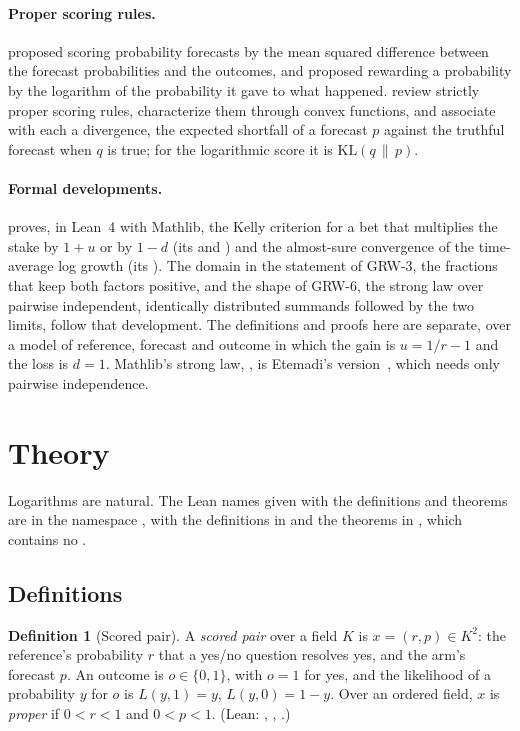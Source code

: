 \documentclass[11pt]{article}
\theoremstyle{plain}
\theoremstyle{definition}
\newtheorem{definition}[theorem]{Definition}
\theoremstyle{remark}
\newcommand{\KL}[2]{\mathrm{KL}(#1\,\|\,#2)}
\begin{document}
\paragraph{Proper scoring rules.} \citet{brier1950} proposed scoring probability forecasts by the
mean squared difference between the forecast probabilities and the outcomes, and \citet{good1952}
proposed rewarding a probability by the logarithm of the probability it gave to what happened.
\citet{gneiting2007} review strictly proper scoring rules, characterize them through convex
functions, and associate with each a divergence, the expected shortfall of a forecast $p$ against
the truthful forecast when $q$ is true; for the logarithmic score it is $\KL{q}{p}$.

\paragraph{Formal developments.} \citet{carrone2026} proves, in Lean~4 with Mathlib, the Kelly
criterion for a bet that multiplies the stake by $1+u$ or by $1-d$ (its  and
) and the almost-sure convergence of the time-average log growth (its
). The domain in the statement of GRW-3, the fractions that keep both
factors positive, and the shape of GRW-6, the strong law over pairwise independent, identically
distributed summands followed by the two limits, follow that development. The definitions and
proofs here are separate, over a model of reference, forecast and outcome in which the gain is
$u=1/r-1$ and the loss is $d=1$. Mathlib's strong law, , is Etemadi's
version~\citep{etemadi1981}, which needs only pairwise independence.

\section{Theory}
\label{sec:theory}

Logarithms are natural. The Lean names given with the definitions and theorems are in the
namespace , with the definitions in  and
the theorems in , which contains no .

\subsection{Definitions}

\begin{definition}[Scored pair]
A \emph{scored pair} over a field $K$ is $x=(r,p)\in K^2$: the reference's probability $r$ that a
yes/no question resolves yes, and the arm's forecast $p$. An outcome is $o\in\{0,1\}$, with $o=1$
for yes, and the likelihood of a probability $y$ for $o$ is $L(y,1)=y$, $L(y,0)=1-y$. Over an
ordered field, $x$ is \emph{proper} if $0<r<1$ and $0<p<1$. (Lean: , ,
.)
\end{definition}
\end{document}
